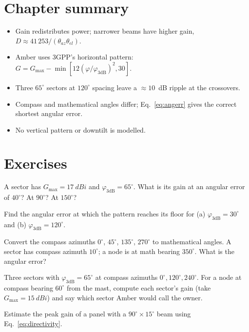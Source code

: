 \section{Chapter summary}
\begin{itemize}
 \item Gain redistributes power; narrower beams have higher gain, $D\approx41\,253/(\theta_{az}\theta_{el})$.
 \item Amber uses 3GPP's horizontal pattern: $G=G_{\max}-\min[12(\varphi/\varphi_{3\mathrm{dB}})^2,30]$.
 \item Three $65^\circ$ sectors at $120^\circ$ spacing leave a $\approx10$~dB ripple at the crossovers.
 \item Compass and mathematical angles differ; Eq.~\eqref{eq:angerr} gives the correct shortest angular error.
 \item No vertical pattern or downtilt is modelled.
\end{itemize}

\section*{Exercises}
\begin{exercise}
A sector has $G_{\max}=\SI{17}{dBi}$ and $\varphi_{3\mathrm{dB}}=65^\circ$. What is its gain at an angular error of $40^\circ$? At $90^\circ$? At $150^\circ$?
\end{exercise}
\begin{exercise}
Find the angular error at which the pattern reaches its floor for (a) $\varphi_{3\mathrm{dB}}=30^\circ$ and (b) $\varphi_{3\mathrm{dB}}=120^\circ$.
\end{exercise}
\begin{exercise}
Convert the compass azimuths $0^\circ$, $45^\circ$, $135^\circ$, $270^\circ$ to mathematical angles. A sector has compass azimuth $10^\circ$; a node is at math bearing $350^\circ$. What is the angular error?
\end{exercise}
\begin{exercise}
Three sectors with $\varphi_{3\mathrm{dB}}=65^\circ$ at compass azimuths $0^\circ,120^\circ,240^\circ$. For a node at compass bearing $60^\circ$ from the mast, compute each sector's gain (take $G_{\max}=\SI{15}{dBi}$) and say which sector Amber would call the owner.
\end{exercise}
\begin{exercise}
Estimate the peak gain of a panel with a $90^\circ\times15^\circ$ beam using Eq.~\eqref{eq:directivity}.
\end{exercise}

